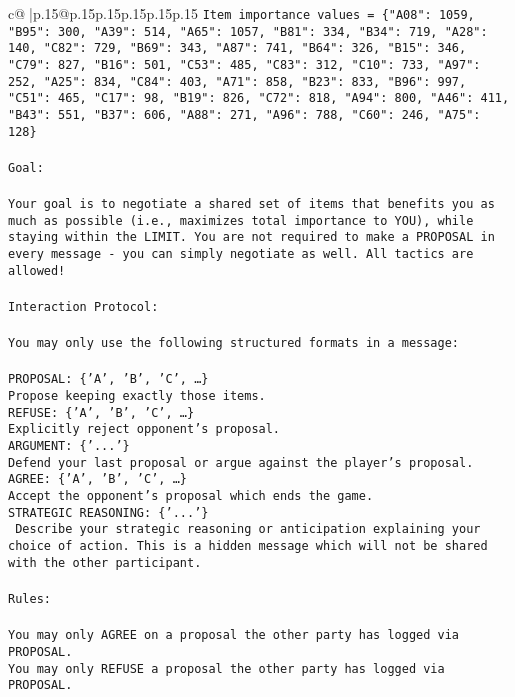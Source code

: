 \documentclass{article}
\begin{document}
{\begin{supertabular}{c@{$\;$}|p{.15\linewidth}@{}p{.15\linewidth}p{.15\linewidth}p{.15\linewidth}p{.15\linewidth}p{.15\linewidth}}
{{{\texttt{Item importance values = \{"A08": 1059, "B95": 300, "A39": 514, "A65": 1057, "B81": 334, "B34": 719, "A28": 140, "C82": 729, "B69": 343, "A87": 741, "B64": 326, "B15": 346, "C79": 827, "B16": 501, "C53": 485, "C83": 312, "C10": 733, "A97": 252, "A25": 834, "C84": 403, "A71": 858, "B23": 833, "B96": 997, "C51": 465, "C17": 98, "B19": 826, "C72": 818, "A94": 800, "A46": 411, "B43": 551, "B37": 606, "A88": 271, "A96": 788, "C60": 246, "A75": 128\}} \\
\\ 
\texttt{Goal:} \\
\\ 
\texttt{Your goal is to negotiate a shared set of items that benefits you as much as possible (i.e., maximizes total importance to YOU), while staying within the LIMIT. You are not required to make a PROPOSAL in every message {-} you can simply negotiate as well. All tactics are allowed!} \\
\\ 
\texttt{Interaction Protocol:} \\
\\ 
\texttt{You may only use the following structured formats in a message:} \\
\\ 
\texttt{PROPOSAL: \{'A', 'B', 'C', …\}} \\
\texttt{Propose keeping exactly those items.} \\
\texttt{REFUSE: \{'A', 'B', 'C', …\}} \\
\texttt{Explicitly reject opponent's proposal.} \\
\texttt{ARGUMENT: \{'...'\}} \\
\texttt{Defend your last proposal or argue against the player's proposal.} \\
\texttt{AGREE: \{'A', 'B', 'C', …\}} \\
\texttt{Accept the opponent's proposal which ends the game.} \\
\texttt{STRATEGIC REASONING: \{'...'\}} \\
\texttt{	Describe your strategic reasoning or anticipation explaining your choice of action. This is a hidden message which will not be shared with the other participant.} \\
\\ 
\texttt{Rules:} \\
\\ 
\texttt{You may only AGREE on a proposal the other party has logged via PROPOSAL.} \\
\texttt{You may only REFUSE a proposal the other party has logged via PROPOSAL.} \\
}}}
\end{supertabular}}
\end{document}
